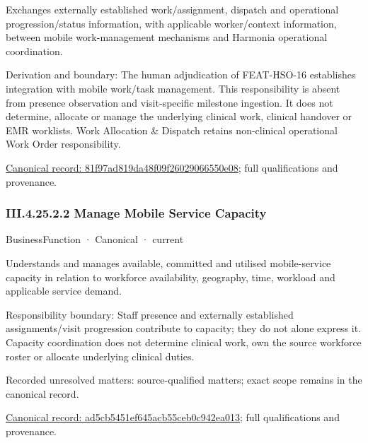 Exchanges externally established work/assignment, dispatch and operational progression/status information, with applicable worker/context information, between mobile work-management mechanisms and Harmonia operational coordination.



Derivation and boundary: The human adjudication of FEAT-HSO-16 establishes integration with mobile work/task management. This responsibility is absent from presence observation and visit-specific milestone ingestion. It does not determine, allocate or manage the underlying clinical work, clinical handover or EMR worklists. Work Allocation \& Dispatch retains non-clinical operational Work Order responsibility.


{\footnotesize \href{../../../../continuum/business/business-function/81f97ad819da48f09f26029066550e08.md}{Canonical record: 81f97ad819da48f09f26029066550e08}; full qualifications and provenance.}\par
\subsubsection*{III.4.25.2.2 Manage Mobile Service Capacity}
\label{navigation:III.4.25.2.2}

\label{element:ad5cb5451ef645acb55ceb0c942ea013}
{\small BusinessFunction · Canonical · current}\par

Understands and manages available, committed and utilised mobile-service capacity in relation to workforce availability, geography, time, workload and applicable service demand.



Responsibility boundary: Staff presence and externally established assignments/visit progression contribute to capacity; they do not alone express it. Capacity coordination does not determine clinical work, own the source workforce roster or allocate underlying clinical duties.


{\small Recorded unresolved matters: source-qualified matters; exact scope remains in the canonical record.}\par
{\footnotesize \href{../../../../continuum/business/business-function/ad5cb5451ef645acb55ceb0c942ea013.md}{Canonical record: ad5cb5451ef645acb55ceb0c942ea013}; full qualifications and provenance.}\par
